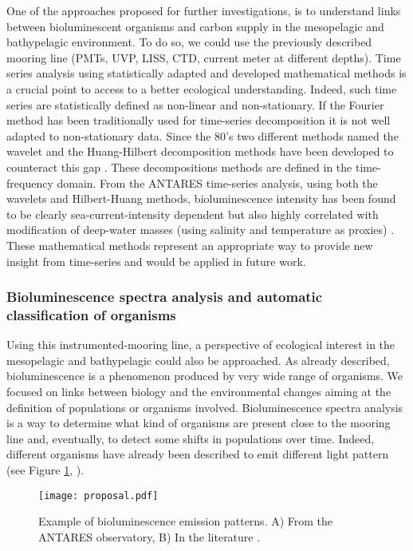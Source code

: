 One of the approaches proposed for further investigations, is to understand links between bioluminescent organisms and carbon supply in the mesopelagic and bathypelagic environment. To do so, we could use the previously described mooring line (PMTs, UVP, LISS, CTD, current meter at different depths). Time series analysis using statistically adapted and developed mathematical methods is a crucial point to access to a better ecological understanding. Indeed, such time series are statistically defined as non-linear and non-stationary. If the Fourier method has been traditionally used for time-series decomposition it is not well adapted to non-stationary data. Since the 80's two different methods named the wavelet and the Huang-Hilbert decomposition methods have been developed to counteract this gap \citep{Huang1998,Torrence1998}. These decompositions methods are defined in the time-frequency domain. From the ANTARES time-series analysis, using both the wavelets and Hilbert-Huang methods, bioluminescence intensity has been found to be clearly sea-current-intensity dependent but also highly correlated with modification of deep-water masses (using salinity and temperature as proxies) \citep{martini2013b}. These mathematical methods represent an appropriate way to provide new insight from time-series and would be applied in future work.\\


\subsubsection*{Bioluminescence spectra analysis and automatic classification of organisms}

Using this instrumented-mooring line, a perspective of ecological interest in the mesopelagic and bathypelagic could also be approached. As already described, bioluminescence is a phenomenon produced by very wide range of organisms. We focused on links between biology and the environmental changes aiming at the definition of populations or organisms involved. Bioluminescence spectra analysis is a way to determine what kind of organisms are present close to the mooring line and, eventually, to detect some shifts in populations over time. Indeed, different organisms have already been described to emit different light pattern (see Figure \ref{proposal}, \citealp{widder1989,nealson1986}).\\

\begin{figure}[!h]
\linespread{1} 
\centering
\texttt{[image: proposal.pdf]}
\caption[Example of bioluminescence emission patterns. A) From the ANTARES observatory, B) In the literature.]{Example of bioluminescence emission patterns. A) From the ANTARES observatory, B) In the literature \citep{hastings1991}.}
\label{proposal}
\end{figure} 
 
